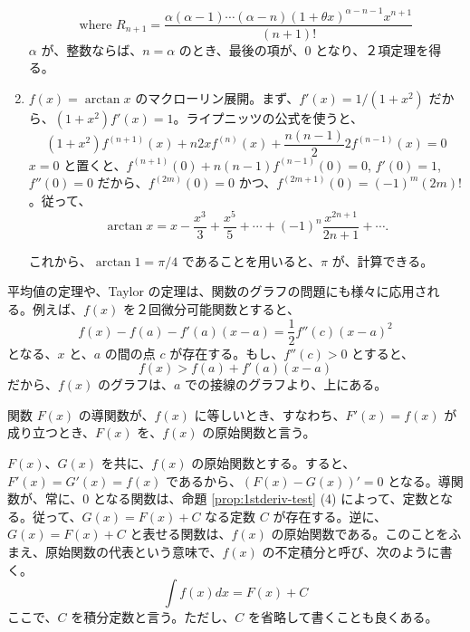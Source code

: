 \begin{eg}
\begin{enumerate}
$$\mbox{where }R_{n+1} = \frac{\alpha(\alpha-1)\cdots(\alpha-n)(1+\theta x)^{\alpha -n - 1}x^{n+1}}{(n+1)!}$$
$\alpha$ が、整数ならば、$n = \alpha$ のとき、最後の項が、$0$ となり、２項定理を得る。
\item $f(x) = \arctan x$ のマクローリン展開。まず、$f'(x) = 1/(1+x^2)$ だから、$(1+x^2)f'(x) = 1$。ライプニッツの公式を使うと、
$$(1+x^2)f^{(n+1)}(x) + n2xf^{(n)}(x) + \frac{n(n-1)}{2}2f^{(n-1)}(x) = 0$$
$x = 0$ と置くと、$f^{(n+1)}(0) + n(n-1)f^{(n-1)}(0) = 0$, $f'(0) = 1$, $f''(0) = 0$ だから、$f^{(2m)}(0) = 0$ かつ、$f^{(2m+1)}(0) = (-1)^m(2m)!$。従って、
$$\arctan x = x - \frac{x^3}{3} + \frac{x^5}{5} +\cdots + (-1)^n\frac{x^{2n+1}}{2n+1} + \cdots.$$

これから、$\arctan 1 = \pi/4$ であることを用いると、$\pi$ が、計算できる。
\end{enumerate}
\end{eg}

平均値の定理や、Taylor の定理は、関数のグラフの問題にも様々に応用される。例えば、$f(x)$ を２回微分可能関数とすると、
$$f(x) - f(a) - f'(a)(x - a) = \frac{1}{2}f''(c)(x-a)^2$$
となる、$x$ と、$a$ の間の点 $c$ が存在する。もし、$f''(c) > 0$  とすると、
$$f(x) > f(a) + f'(a)(x-a)$$
だから、$f(x)$ のグラフは、$a$ での接線のグラフより、上にある。


\newpage{}
\begin{definition}
関数 $F(x)$ の導関数が、$f(x)$ に等しいとき、すなわち、$F'(x) = f(x)$ が成り立つとき、$F(x)$ を、$f(x)$ の原始関数と言う。
\end{definition}

$F(x)$、$G(x)$ を共に、$f(x)$ の原始関数とする。すると、$F'(x) = G'(x) = f(x)$ であるから、$(F(x) - G(x))' = 0$  となる。導関数が、常に、$0$ となる関数は、命題 \ref{prop:1stderiv-test} (4) によって、定数となる。従って、$G(x) = F(x) + C$ なる定数 $C$ が存在する。逆に、$G(x) = F(x) + C$ と表せる関数は、$f(x)$ の原始関数である。このことをふまえ、原始関数の代表という意味で、$f(x)$ の不定積分と呼び、次のように書く。
$$\int f(x)dx = F(x) + C$$
ここで、$C$ を積分定数と言う。ただし、$C$ を省略して書くことも良くある。

